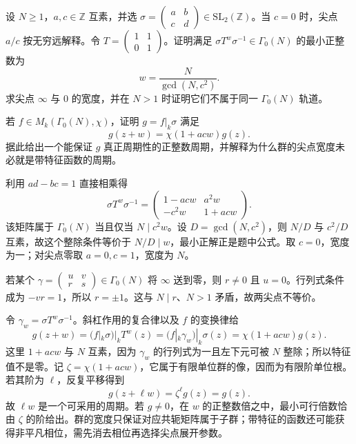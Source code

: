 \begin{exercise}\label{b3:ex:E-7}
设 \(N\ge1\)，\(a,c\in\mathbb Z\) 互素，并选
\(\sigma=\left(\begin{smallmatrix}a&b\\c&d\end{smallmatrix}\right)\in\mathrm{SL}_2(\mathbb Z)\)。当 \(c=0\) 时，尖点 \(a/c\) 按无穷远解释。令 \(T=\left(\begin{smallmatrix}1&1\\0&1\end{smallmatrix}\right)\)。证明满足 \(\sigma T^w\sigma^{-1}\in\Gamma_0(N)\) 的最小正整数为
\[
 w=\frac{N}{\gcd(N,c^2)}.
\]
求尖点 \(\infty\) 与 \(0\) 的宽度，并在 \(N>1\) 时证明它们不属于同一 \(\Gamma_0(N)\) 轨道。

若 \(f\in M_k(\Gamma_0(N),\chi)\)，证明 \(g=f|_k\sigma\) 满足
\[
 g(z+w)=\chi(1+acw)g(z).
\]
据此给出一个能保证 \(g\) 真正周期性的正整数周期，并解释为什么群的尖点宽度未必就是带特征函数的周期。
\end{exercise}
\begin{solution}
利用 \(ad-bc=1\) 直接相乘得
\[
 \sigma T^w\sigma^{-1}
 =\begin{pmatrix}
   1-acw&a^2w\\
   -c^2w&1+acw
  \end{pmatrix}.
\]
该矩阵属于 \(\Gamma_0(N)\) 当且仅当 \(N\mid c^2w\)。设 \(D=\gcd(N,c^2)\)，则 \(N/D\) 与 \(c^2/D\) 互素，故这个整除条件等价于 \(N/D\mid w\)，最小正解正是题中公式。取 \(c=0\)，宽度为一；对尖点零取 \(a=0,c=1\)，宽度为 \(N\)。

若某个 \(\gamma=\left(\begin{smallmatrix}u&v\\r&s\end{smallmatrix}\right)\in\Gamma_0(N)\) 将 \(\infty\) 送到零，则 \(r\ne0\) 且 \(u=0\)。行列式条件成为 \(-vr=1\)，所以 \(r=\pm1\)。这与 \(N\mid r\)、\(N>1\) 矛盾，故两尖点不等价。

令 \(\gamma_w=\sigma T^w\sigma^{-1}\)。斜杠作用的复合律以及 \(f\) 的变换律给
\[
 g(z+w)=(f|_k\sigma)|_kT^w(z)
       =(f|_k\gamma_w)|_k\sigma(z)
       =\chi(1+acw)g(z).
\]
这里 \(1+acw\) 与 \(N\) 互素，因为 \(\gamma_w\) 的行列式为一且左下元可被 \(N\) 整除；所以特征值不是零。记 \(\zeta=\chi(1+acw)\)，它属于有限单位群的像，因而为有限阶单位根。若其阶为 \(\ell\)，反复平移得到
\[
 g(z+\ell w)=\zeta^\ell g(z)=g(z).
\]
故 \(\ell w\) 是一个可采用的周期。若 \(g\ne0\)，在 \(w\) 的正整数倍之中，最小可行倍数恰由 \(\zeta\) 的阶给出。群的宽度只保证对应共轭矩阵属于子群；带特征的函数还可能获得非平凡相位，需先消去相位再选择尖点展开参数。
\end{solution}

